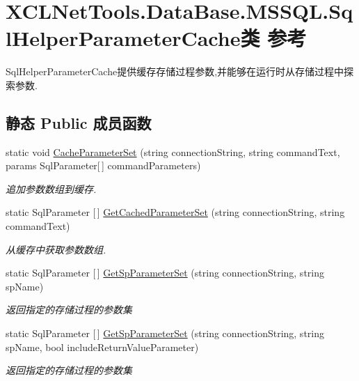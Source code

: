 \hypertarget{class_x_c_l_net_tools_1_1_data_base_1_1_m_s_s_q_l_1_1_sql_helper_parameter_cache}{}\section{X\+C\+L\+Net\+Tools.\+Data\+Base.\+M\+S\+S\+Q\+L.\+Sql\+Helper\+Parameter\+Cache类 参考}
\label{class_x_c_l_net_tools_1_1_data_base_1_1_m_s_s_q_l_1_1_sql_helper_parameter_cache}


Sql\+Helper\+Parameter\+Cache提供缓存存储过程参数,并能够在运行时从存储过程中探索参数.  


\subsection*{静态 Public 成员函数}
\begin{DoxyCompactItemize}
\item 
static void \hyperlink{class_x_c_l_net_tools_1_1_data_base_1_1_m_s_s_q_l_1_1_sql_helper_parameter_cache_a4c9d3ea3efdc1a0c29c522ad7fde1900}{Cache\+Parameter\+Set} (string connection\+String, string command\+Text, params Sql\+Parameter\mbox{[}$\,$\mbox{]} command\+Parameters)
\begin{DoxyCompactList}\small\item\em 追加参数数组到缓存. \end{DoxyCompactList}\item 
static Sql\+Parameter \mbox{[}$\,$\mbox{]} \hyperlink{class_x_c_l_net_tools_1_1_data_base_1_1_m_s_s_q_l_1_1_sql_helper_parameter_cache_a6003ff6a4a36764733a6487d083458b7}{Get\+Cached\+Parameter\+Set} (string connection\+String, string command\+Text)
\begin{DoxyCompactList}\small\item\em 从缓存中获取参数数组. \end{DoxyCompactList}\item 
static Sql\+Parameter \mbox{[}$\,$\mbox{]} \hyperlink{class_x_c_l_net_tools_1_1_data_base_1_1_m_s_s_q_l_1_1_sql_helper_parameter_cache_a58ac469fef0b1bfbe5d246c29d04a885}{Get\+Sp\+Parameter\+Set} (string connection\+String, string sp\+Name)
\begin{DoxyCompactList}\small\item\em 返回指定的存储过程的参数集 \end{DoxyCompactList}\item 
static Sql\+Parameter \mbox{[}$\,$\mbox{]} \hyperlink{class_x_c_l_net_tools_1_1_data_base_1_1_m_s_s_q_l_1_1_sql_helper_parameter_cache_a7890bc8805a1a41b5934963c58d98771}{Get\+Sp\+Parameter\+Set} (string connection\+String, string sp\+Name, bool include\+Return\+Value\+Parameter)
\begin{DoxyCompactList}\small\item\em 返回指定的存储过程的参数集 \end{DoxyCompactList}\end{DoxyCompactItemize}


